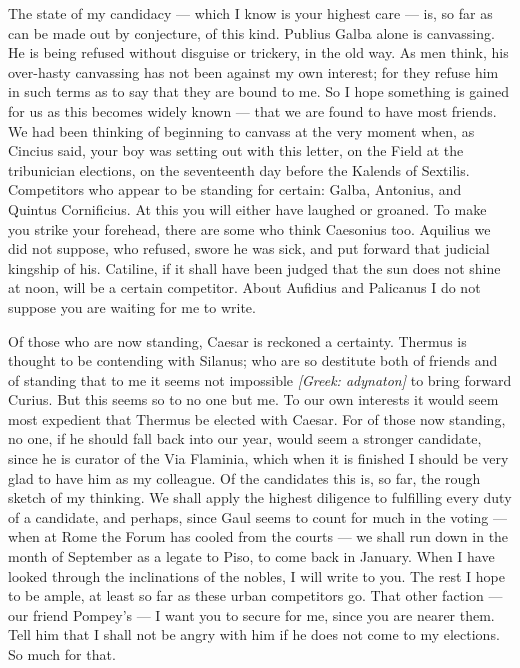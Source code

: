 

 The state of my candidacy --- which I know is your highest care --- is, so far as can be made out by conjecture, of this kind. Publius Galba alone is canvassing. He is being refused without disguise or trickery, in the old way. As men think, his over-hasty canvassing has not been against my own interest; for they refuse him in such terms as to say that they are bound to me. So I hope something is gained for us as this becomes widely known --- that we are found to have most friends. We had been thinking of beginning to canvass at the very moment when, as Cincius said, your boy was setting out with this letter, on the Field at the tribunician elections, on the seventeenth day before the Kalends of Sextilis. Competitors who appear to be standing for certain: Galba, Antonius, and Quintus Cornificius. At this you will either have laughed or groaned. To make you strike your forehead, there are some who think Caesonius too. Aquilius we did not suppose, who refused, swore he was sick, and put forward that judicial kingship of his. Catiline, if it shall have been judged that the sun does not shine at noon, will be a certain competitor. About Aufidius and Palicanus I do not suppose you are waiting for me to write.

 Of those who are now standing, Caesar is reckoned a certainty. Thermus is thought to be contending with Silanus; who are so destitute both of friends and of standing that to me it seems not impossible \textit{[Greek: adynaton]} to bring forward Curius. But this seems so to no one but me. To our own interests it would seem most expedient that Thermus be elected with Caesar. For of those now standing, no one, if he should fall back into our year, would seem a stronger candidate, since he is curator of the Via Flaminia, which when it is finished I should be very glad to have him as my colleague\textellipsis . Of the candidates this is, so far, the rough sketch of my thinking. We shall apply the highest diligence to fulfilling every duty of a candidate, and perhaps, since Gaul seems to count for much in the voting --- when at Rome the Forum has cooled from the courts --- we shall run down in the month of September as a legate to Piso, to come back in January. When I have looked through the inclinations of the nobles, I will write to you. The rest I hope to be ample, at least so far as these urban competitors go. That other faction --- our friend Pompey's --- I want you to secure for me, since you are nearer them. Tell him that I shall not be angry with him if he does not come to my elections. So much for that.

